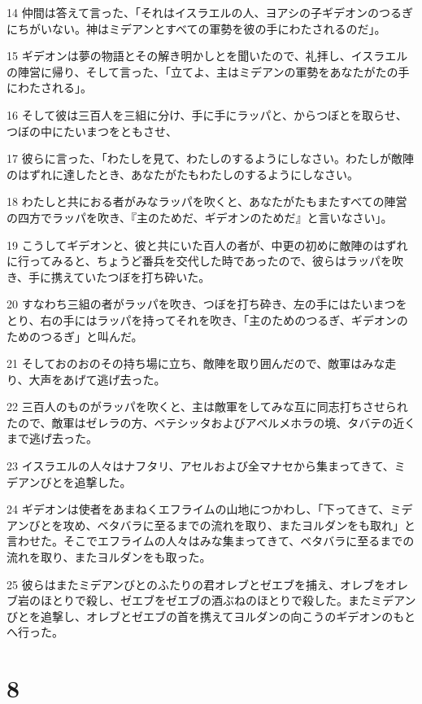 \par 14 仲間は答えて言った、「それはイスラエルの人、ヨアシの子ギデオンのつるぎにちがいない。神はミデアンとすべての軍勢を彼の手にわたされるのだ」。
\par 15 ギデオンは夢の物語とその解き明かしとを聞いたので、礼拝し、イスラエルの陣営に帰り、そして言った、「立てよ、主はミデアンの軍勢をあなたがたの手にわたされる」。
\par 16 そして彼は三百人を三組に分け、手に手にラッパと、からつぼとを取らせ、つぼの中にたいまつをともさせ、
\par 17 彼らに言った、「わたしを見て、わたしのするようにしなさい。わたしが敵陣のはずれに達したとき、あなたがたもわたしのするようにしなさい。
\par 18 わたしと共におる者がみなラッパを吹くと、あなたがたもまたすべての陣営の四方でラッパを吹き、『主のためだ、ギデオンのためだ』と言いなさい」。
\par 19 こうしてギデオンと、彼と共にいた百人の者が、中更の初めに敵陣のはずれに行ってみると、ちょうど番兵を交代した時であったので、彼らはラッパを吹き、手に携えていたつぼを打ち砕いた。
\par 20 すなわち三組の者がラッパを吹き、つぼを打ち砕き、左の手にはたいまつをとり、右の手にはラッパを持ってそれを吹き、「主のためのつるぎ、ギデオンのためのつるぎ」と叫んだ。
\par 21 そしておのおのその持ち場に立ち、敵陣を取り囲んだので、敵軍はみな走り、大声をあげて逃げ去った。
\par 22 三百人のものがラッパを吹くと、主は敵軍をしてみな互に同志打ちさせられたので、敵軍はゼレラの方、ベテシッタおよびアベルメホラの境、タバテの近くまで逃げ去った。
\par 23 イスラエルの人々はナフタリ、アセルおよび全マナセから集まってきて、ミデアンびとを追撃した。
\par 24 ギデオンは使者をあまねくエフライムの山地につかわし、「下ってきて、ミデアンびとを攻め、ベタバラに至るまでの流れを取り、またヨルダンをも取れ」と言わせた。そこでエフライムの人々はみな集まってきて、ベタバラに至るまでの流れを取り、またヨルダンをも取った。
\par 25 彼らはまたミデアンびとのふたりの君オレブとゼエブを捕え、オレブをオレブ岩のほとりで殺し、ゼエブをゼエブの酒ぶねのほとりで殺した。またミデアンびとを追撃し、オレブとゼエブの首を携えてヨルダンの向こうのギデオンのもとへ行った。

\chapter{8}

